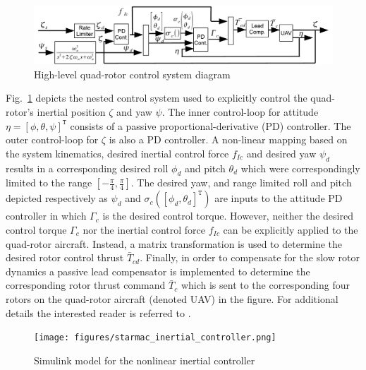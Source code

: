 \begin{figure}[ht]
  \centering
  \includegraphics[width=\columnwidth]{figures/high_level_quad_control_sys}
  \caption{High-level quad-rotor control system diagram \cite{NJ:ISIS-08-911}}
  \label{fig:high_level_quad_control_sys}
\end{figure}


Fig.~\ref{fig:high_level_quad_control_sys} depicts the nested control system used to explicitly control the quad-rotor's inertial position $\zeta$ and yaw $\psi$.  The inner control-loop for attitude $\eta = [\phi,\theta,\psi]^\mathtt{T}$ consists of a passive proportional-derivative (PD) controller.  The outer control-loop for $\zeta$ is also a PD controller.  A non-linear mapping based on the system kinematics, desired inertial control force $f_{Ic}$ and desired yaw $\psi_d$ results in a corresponding desired roll $\phi_d$ and pitch $\theta_d$ which were correspondingly limited to the range $[-\frac{\pi}{4},\frac{\pi}{4}]$.  The desired yaw, and range limited roll and pitch depicted respectively as $\psi_d$ and $\sigma_c([\phi_d,\theta_d]^\mathtt{T})$ are inputs to the attitude PD controller in which $\Gamma_c$ is the desired control torque.  However, neither the desired control torque $\Gamma_c$ nor the inertial control force $f_{Ic}$ can be explicitly applied to the quad-rotor aircraft.  Instead, a matrix transformation is used to determine the desired rotor control thrust $\bar{T}_{cd}$.  Finally, in order to compensate for the slow rotor dynamics a passive lead compensator is implemented to determine the corresponding rotor thrust command $\bar{T}_c$ which is sent to the corresponding four rotors on the quad-rotor aircraft (denoted UAV) in the figure.  For additional details the interested reader is referred to \cite{NJ:ISIS-08-911}.

\begin{figure}[ht]
\centering
\texttt{[image: figures/starmac\_inertial\_controller.png]}
    \caption{Simulink model for the nonlinear inertial controller}
    \label{fig:controller}
\end{figure}


